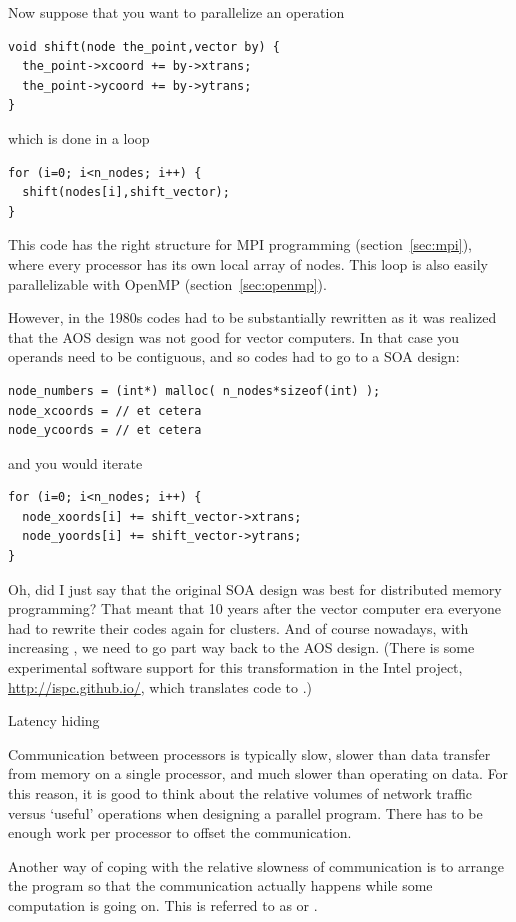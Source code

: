 Now suppose that you want to parallelize an operation
\begin{verbatim}
void shift(node the_point,vector by) {
  the_point->xcoord += by->xtrans;
  the_point->ycoord += by->ytrans;
}
\end{verbatim}
which is done in a loop
\begin{verbatim}
for (i=0; i<n_nodes; i++) {
  shift(nodes[i],shift_vector);
}
\end{verbatim}
This code has the right structure for MPI programming
(section~\ref{sec:mpi}), where every processor has its own local array
of nodes. This loop is also easily parallelizable with OpenMP
(section~\ref{sec:openmp}).

However, in the 1980s codes had to be substantially rewritten as it
was realized that the AOS design was not good for vector computers.
In that case you operands need to be contiguous, and so codes had to 
go to a SOA design:
\begin{verbatim}
node_numbers = (int*) malloc( n_nodes*sizeof(int) );
node_xcoords = // et cetera
node_ycoords = // et cetera
\end{verbatim}
and you would iterate
\begin{verbatim}
for (i=0; i<n_nodes; i++) {
  node_xoords[i] += shift_vector->xtrans;
  node_yoords[i] += shift_vector->ytrans;
}
\end{verbatim}

Oh, did I just say that the original SOA design was best for
distributed memory programming?  That meant that 10 years after the
vector computer era everyone had to rewrite their codes again for
clusters. And of course nowadays, with
increasing , we need to go part way back to
the AOS design.
(There is some experimental software support for this transformation
in the Intel  project, \url{http://ispc.github.io/},
which translates  code to .)

 {Latency hiding}
\label{sec:comcom-overlap}

Communication between processors is typically slow, slower than data
transfer from memory on a single processor, and much slower than
operating on data. For this reason, it is good to think about the
relative volumes of network traffic versus `useful' operations when
designing a parallel program. There has to be enough work per
processor to offset the communication.

Another way of coping with the relative slowness of
communication is to arrange the program so that the communication
actually happens while some computation is going on. This is referred
to as  or
.


